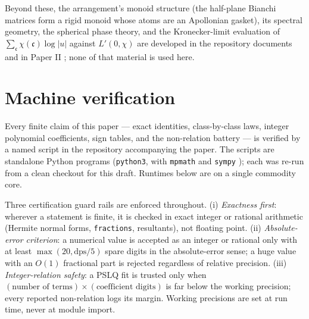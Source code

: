 \documentclass[11pt]{amsart}
\numberwithin{equation}{section}
\theoremstyle{plain}
\theoremstyle{definition}
\theoremstyle{remark}
\newcommand{\idealc}{\mathfrak{c}}
\begin{document}
Beyond these, the arrangement's monoid structure (the half-plane
Bianchi matrices form a rigid monoid whose atoms are an Apollonian
gasket), its spectral geometry, the spherical phase theory, and the
Kronecker-limit evaluation of $\sum_{\idealc}\chi(\idealc)\log|u|$
against $L'(0, \chi)$ are developed in the repository documents and in
Paper II \cite{PaperII}; none of that material is used here.

\appendix

\section{Machine verification}\label{app:verification}

Every finite claim of this paper --- exact identities, class-by-class
laws, integer polynomial coefficients, sign tables, and the
non-relation battery --- is verified by a named script in the
repository accompanying the paper.  The scripts are standalone Python
programs (\texttt{python3}, with \texttt{mpmath} \cite{mpmath} and
\texttt{sympy} \cite{sympy}); each was re-run from a clean checkout
for this draft.  Runtimes below are on a single commodity core.

Three certification guard rails are enforced throughout.
(i) \emph{Exactness first}: wherever a statement is finite, it is
checked in exact integer or rational arithmetic (Hermite normal forms,
\texttt{fractions}, resultants), not floating point.
(ii) \emph{Absolute-error criterion}: a numerical value is accepted as
an integer or rational only with at least $\max(20, \mathrm{dps}/5)$
spare digits in the absolute-error sense; a huge value with an $O(1)$
fractional part is rejected regardless of relative precision.
(iii) \emph{Integer-relation safety}: a PSLQ fit is trusted only when
$(\text{number of terms}) \times (\text{coefficient digits})$ is far
below the working precision; every reported non-relation logs its
margin.  Working precisions are set at run time, never at module
import.
\end{document}
